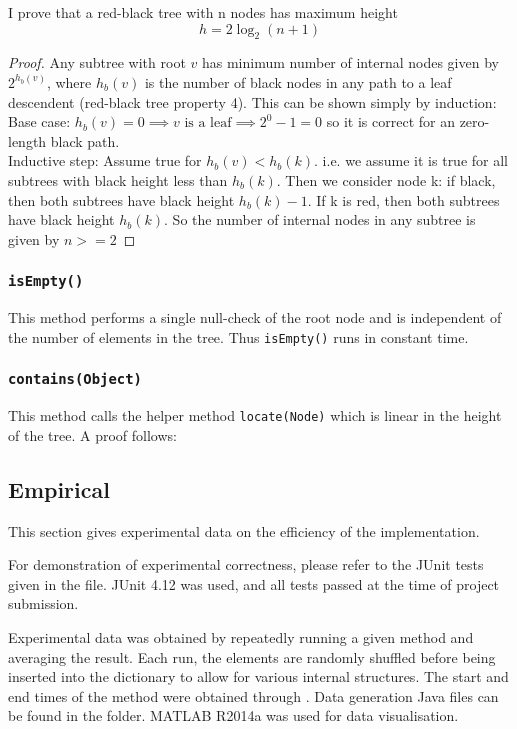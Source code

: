 I prove that a red-black tree with n nodes has maximum height
\begin{equation*}
h = 2 \log_2(n + 1)
\end{equation*}

\begin{proof}
    Any subtree with root $v$ has minimum number of internal nodes given by $2^{h_b (v)}$, where $h_b (v)$ is the number of black nodes in any path to a leaf descendent (red-black tree property 4). This can be shown simply by induction: \\
    Base case: $h_b (v) = 0 \implies v \text{ is a leaf} \implies 2^0 - 1 = 0$ so it is correct for an zero-length black path. \\
    Inductive step: Assume true for $h_b (v) < h_b(k)$. i.e. we assume it is true for all subtrees with black height less than $h_b(k)$. Then we consider node k: if black, then both subtrees have black height $h_b(k) - 1$. If k is red, then both subtrees have black height $h_b(k)$. So the number of internal nodes in any subtree is given by $n >= 2 $
\end{proof}

\subsubsection{\texttt{isEmpty()}}
This method performs a single null-check of the root node and is independent of the number of elements in the tree. Thus \texttt{isEmpty()} runs in constant time.

\subsubsection{\texttt{contains(Object)}}
This method calls the helper method \texttt{locate(Node)} which is linear in the height of the tree. A proof follows: \\


\subsection{Empirical}

This section gives experimental data on the efficiency of the implementation.

For demonstration of experimental correctness, please refer to the JUnit tests given in the  file. JUnit 4.12 was used, and all tests passed at the time of project submission.

Experimental data was obtained by repeatedly running a given method and averaging the result. Each run, the elements are randomly shuffled before being inserted into the dictionary to allow for various internal structures. The start and end times of the method were obtained through . Data generation Java files can be found in the  folder. MATLAB R2014a was used for data visualisation.
 
